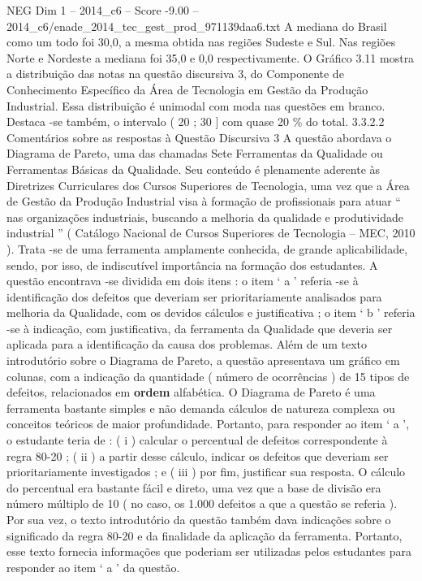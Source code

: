 \begin{textsample}{NEG Dim 1 – 2014\_c6 – Score -9.00 – 2014\_c6/enade\_2014\_tec\_gest\_prod\_971139daa6.txt}
A mediana do Brasil como um todo foi 30,0, a mesma obtida nas regiões Sudeste e Sul.
Nas regiões Norte e Nordeste a mediana foi 35,0 e 0,0 respectivamente.
O Gráfico 3.11 mostra a distribuição das notas na questão discursiva 3, do Componente de Conhecimento Específico da Área de Tecnologia em Gestão da Produção Industrial.
Essa distribuição é unimodal com moda nas questões em branco.
Destaca -se também, o intervalo ( 20 ; 30 ] com quase 20 \% do total. 3.3.2.2 Comentários sobre as respostas à Questão Discursiva 3 A questão abordava o Diagrama de Pareto, uma das chamadas Sete Ferramentas da Qualidade ou Ferramentas Básicas da Qualidade.
Seu conteúdo é plenamente aderente às Diretrizes Curriculares dos Cursos Superiores de Tecnologia, uma vez que a Área de Gestão da Produção Industrial visa à formação de profissionais para atuar “ nas organizações industriais, buscando a melhoria da qualidade e produtividade industrial ” ( Catálogo Nacional de Cursos Superiores de Tecnologia – MEC, 2010 ).
Trata -se de uma ferramenta amplamente conhecida, de grande aplicabilidade, sendo, por isso, de indiscutível importância na formação dos estudantes.
A questão encontrava -se dividida em dois itens : o item ‘ a ’ referia -se à identificação dos defeitos que deveriam ser prioritariamente analisados para melhoria da Qualidade, com os devidos cálculos e justificativa ; o item ‘ b ’ referia -se à indicação, com justificativa, da ferramenta da Qualidade que deveria ser aplicada para a identificação da causa dos problemas.
Além de um texto introdutório sobre o Diagrama de Pareto, a questão apresentava um gráfico em colunas, com a indicação da quantidade ( número de ocorrências ) de 15 tipos de defeitos, relacionados em \textbf{ordem} alfabética.
O Diagrama de Pareto é uma ferramenta bastante simples e não demanda cálculos de natureza complexa ou conceitos teóricos de maior profundidade.
Portanto, para responder ao item ‘ a ’, o estudante teria de : ( i ) calcular o percentual de defeitos correspondente à regra 80-20 ; ( ii ) a partir desse cálculo, indicar os defeitos que deveriam ser prioritariamente investigados ; e ( iii ) por fim, justificar sua resposta.
O cálculo do percentual era bastante fácil e direto, uma vez que a base de divisão era número múltiplo de 10 ( no caso, os 1.000 defeitos a que a questão se referia ).
Por sua vez, o texto introdutório da questão também dava indicações sobre o significado da regra 80-20 e da finalidade da aplicação da ferramenta.
Portanto, esse texto fornecia informações que poderiam ser utilizadas pelos estudantes para responder ao item ‘ a ’ da questão.

\end{textsample}
